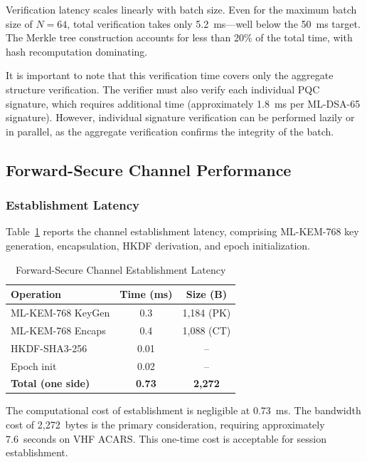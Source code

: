 \documentclass[conference,10pt]{IEEEtran}
\begin{document}
Verification latency scales linearly with batch size. Even for the maximum batch size of $N=64$, total verification takes only 5.2~ms---well below the 50~ms target. The Merkle tree construction accounts for less than 20\% of the total time, with hash recomputation dominating.

It is important to note that this verification time covers only the aggregate structure verification. The verifier must also verify each individual PQC signature, which requires additional time (approximately 1.8~ms per ML-DSA-65 signature). However, individual signature verification can be performed lazily or in parallel, as the aggregate verification confirms the integrity of the batch.

\subsection{Forward-Secure Channel Performance}

\subsubsection{Establishment Latency}

Table~\ref{tab:establish_latency} reports the channel establishment latency, comprising ML-KEM-768 key generation, encapsulation, HKDF derivation, and epoch initialization.

\begin{table}[t]
\centering
\caption{Forward-Secure Channel Establishment Latency}
\label{tab:establish_latency}
\begin{tabular}{lcc}
\toprule
\textbf{Operation} & \textbf{Time (ms)} & \textbf{Size (B)} \\
\midrule
ML-KEM-768 KeyGen & 0.3 & 1,184 (PK) \\
ML-KEM-768 Encaps & 0.4 & 1,088 (CT) \\
HKDF-SHA3-256 & 0.01 & -- \\
Epoch init & 0.02 & -- \\
\midrule
\textbf{Total (one side)} & \textbf{0.73} & \textbf{2,272} \\
\bottomrule
\end{tabular}
\end{table}

The computational cost of establishment is negligible at 0.73~ms. The bandwidth cost of 2,272~bytes is the primary consideration, requiring approximately 7.6~seconds on VHF ACARS. This one-time cost is acceptable for session establishment.
\end{document}
